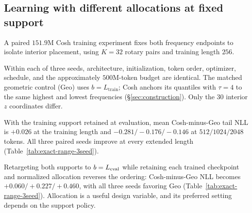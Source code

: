 \subsection{Learning with different allocations at fixed support}
\label{sec:exp-identify}

A paired $151.9$M Cosh training experiment fixes both frequency endpoints
to isolate interior placement, using $K=32$ rotary pairs and training length $256$.

Within each of three seeds, architecture, initialization, token order, optimizer, schedule, and the approximately $500$M-token budget are identical. The matched geometric control (Geo) uses $b=L_{\mathrm{train}}$; Cosh anchors its quantiles with $\tau=4$ to the same highest and lowest frequencies (\S\ref{sec:construction}). Only the $30$ interior $z$ coordinates differ.

With the training support retained at evaluation, mean Cosh-minus-Geo tail NLL is $+0.026$ at the training length and $-0.281/-0.176/-0.146$ at $512/1024/2048$ tokens. All three paired seeds improve at every extended length (Table~\ref{tab:exact-range-3seed}).

Retargeting both supports to $b=L_{\rm eval}$ while retaining each trained checkpoint and normalized allocation reverses the ordering: Cosh-minus-Geo NLL becomes $+0.060/+0.227/+0.460$, with all three seeds favoring Geo (Table~\ref{tab:exact-range-3seed}). Allocation is a useful design variable, and its preferred setting depends on the support policy.
